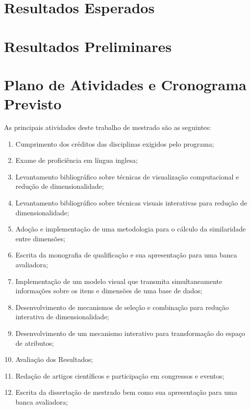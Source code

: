\section{Resultados Esperados}

\section{Resultados Preliminares}

\section{Plano de Atividades e Cronograma Previsto}\label{sec:cronograma}

As principais atividades deste trabalho de mestrado são as seguintes:

\begin{enumerate}

    \item Cumprimento dos créditos das disciplinas exigidos pelo programa;

    \item Exame de proficiência em língua inglesa;

    \item Levantamento bibliográfico sobre técnicas de visualização computacional e redução de dimensionalidade;   

    \item Levantamento bibliográfico sobre técnicas visuais interativas para redução de dimensionalidade;  

    \item Adoção e implementação de uma metodologia para o cálculo da similaridade entre dimensões;

    \item Escrita da monografia de qualificação e sua apresentação para uma banca avaliadora;

    \item Implementação de um modelo visual que transmita simultaneamente informações sobre os itens e dimensões de uma base de dados;

    \item Desenvolvimento de mecanismos de seleção e combinação para redução interativa de dimensionalidade;

    \item Desenvolvimento de um mecanismo interativo para transformação do espaço de atributos;

    \item Avaliação dos Resultados;

    \item Redação de artigos científicos e participação em congressos e eventos; 

    \item Escrita da dissertação de mestrado bem como sua apresentação para uma banca avaliadora;

\end{enumerate}

